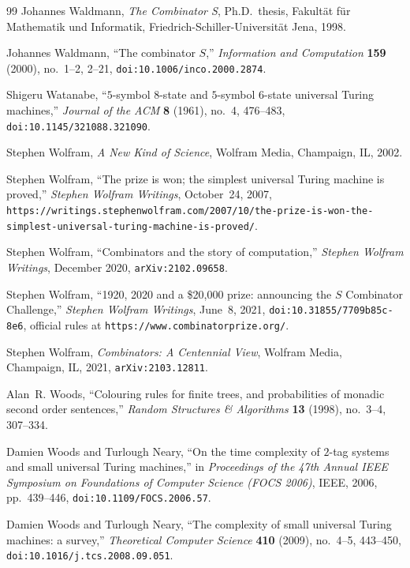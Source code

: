 \documentclass[11pt,reqno]{amsart}
\numberwithin{equation}{section}
\theoremstyle{plain}
\theoremstyle{definition}
\theoremstyle{remark}
\begin{document}
\begin{thebibliography}{99}
Johannes Waldmann,
\emph{The Combinator S},
Ph.D.\ thesis, Fakult{\"a}t f{\"u}r Mathematik und Informatik, Friedrich-Schiller-Universit{\"a}t Jena, 1998.

Johannes Waldmann,
``The combinator $S$,''
\emph{Information and Computation} \textbf{159} (2000), no.~1--2, 2--21,
\texttt{doi:10.1006/inco.2000.2874}.

Shigeru Watanabe,
``$5$-symbol $8$-state and $5$-symbol $6$-state universal Turing machines,''
\emph{Journal of the ACM} \textbf{8} (1961), no.~4, 476--483,
\texttt{doi:10.1145/321088.321090}.

Stephen Wolfram,
\emph{A New Kind of Science},
Wolfram Media, Champaign, IL, 2002.

Stephen Wolfram,
``The prize is won; the simplest universal Turing machine is proved,''
\emph{Stephen Wolfram Writings}, October~24, 2007,
\texttt{https://writings.stephenwolfram.com/2007/10/the-prize-is-won-the-simplest-universal-turing-machine-is-proved/}.

Stephen Wolfram,
``Combinators and the story of computation,''
\emph{Stephen Wolfram Writings}, December 2020, \texttt{arXiv:2102.09658}.

Stephen Wolfram,
``1920, 2020 and a \$20,000 prize: announcing the $S$ Combinator Challenge,''
\emph{Stephen Wolfram Writings}, June~8, 2021, \texttt{doi:10.31855/7709b85c-8e6},
official rules at \texttt{https://www.combinatorprize.org/}.

Stephen Wolfram,
\emph{Combinators: A Centennial View},
Wolfram Media, Champaign, IL, 2021, \texttt{arXiv:2103.12811}.

Alan~R. Woods,
``Colouring rules for finite trees, and probabilities of monadic second order sentences,''
\emph{Random Structures \& Algorithms} \textbf{13} (1998), no.~3--4, 307--334.

Damien Woods and Turlough Neary,
``On the time complexity of $2$-tag systems and small universal Turing machines,''
in \emph{Proceedings of the 47th Annual IEEE Symposium on Foundations of Computer Science (FOCS 2006)},
IEEE, 2006, pp.~439--446, \texttt{doi:10.1109/FOCS.2006.57}.

Damien Woods and Turlough Neary,
``The complexity of small universal Turing machines: a survey,''
\emph{Theoretical Computer Science} \textbf{410} (2009), no.~4--5, 443--450,
\texttt{doi:10.1016/j.tcs.2008.09.051}.


\end{thebibliography}
\end{document}
